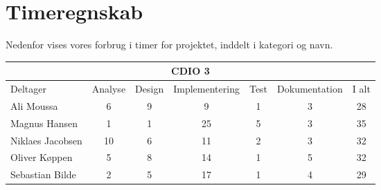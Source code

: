 \chapter*{Timeregnskab}

Nedenfor vises vores forbrug i timer for projektet, inddelt i kategori og navn.

\begin{table}[h]
    \centering
        \begin{tabular}{|l|c|c|c|c|c|c|}
                \hline
            \multicolumn{7}{|c|}{CDIO 3}
            \\ \hline
                    Deltager         &  Analyse  &  Design  &  Implementering  &  Test  &  Dokumentation  &  I alt
            \\ \hline
                    Ali Moussa       &    6      &    9     &        9         &    1   &        3        &    28
            \\ \hline
                    Magnus Hansen    &    1      &    1     &        25         &    5   &        3        &    35
            \\ \hline
                    Niklaes Jacobsen &    10      &    6     &        11         &    2   &        3        &    32
            \\ \hline
                    Oliver Køppen    &    5      &    8     &        14        &    1   &        5        &    32
            \\ \hline
                    Sebastian Bilde  &    2      &    5     &        17         &    1   &        4        &   29
            \\ \hline
        \end{tabular}
\end{table}